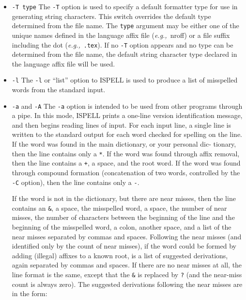 \begin{itemize}
\item {\Large\tt -T type}\sunspec{\\}{}
The \verb+-T+ option is used to specify a default formatter type for use in
generating string characters.
This switch overrides the default type determined from the file name.
The \verb+type+ argument may be either one of the unique names defined in the
language affix file ({\it{e.g.,}}\ nroff) or a file suffix including the dot
({\it{e.g.,}}\ \verb+.tex+)\@.  If no \verb+-T+ option appears and no type
can be determined from the file name, the default string character type
declared in the language affix file will be used.

\item {\Large\tt -l}\sunspec{\\}{}
The \verb+-l+ or ``list'' option to ISPELL is used to produce a list of
misspelled words from the standard input.

\item {\Large\tt -a} and {\Large\tt -A}\sunspec{\\}{}
The \verb+-a+ option is intended to be used from other programs through a pipe.
In this mode, ISPELL prints a one-line version identification message, and
then begins reading lines of input.
For each input line, a single line is written to the standard output for each
word checked for spelling on the line.
If the word was found in the main dictionary, or your personal dic-
tionary, then the line contains only a \verb+*+\@.
If the word was found through affix removal, then the line contains a \verb-+-,
a space, and the root word.
If the word was found through compound formation (concatenation of two words,
controlled by the \verb+-C+ option), then the line contains only a \verb+-+\@.

If the word is not in the dictionary, but there are near misses, then the
line contains an \verb+&+, a space, the misspelled word, a space, the number of
near misses, the number of characters between the beginning of the line and
the beginning of the misspelled word, a colon, another space, and a list of
the near misses separated by commas and spaces.
Following the near misses (and identified only by the count of near misses), if
the word could be formed by adding (illegal) affixes to a known root, is a
list of suggested derivations, again separated by commas and spaces.
If there are no near misses at all, the line format is the same, except that
the \verb+&+ is replaced by \verb+?+ (and the near-miss count is always zero).
The suggested derivations following the near misses are in the form:


\end{itemize}

